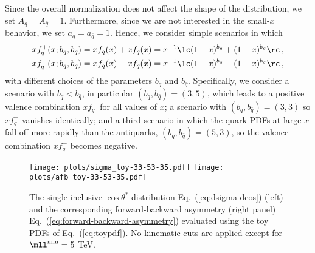 Since the overall normalization does not affect the shape
of the distribution, we set $A_q=A_{\bar{q}}=1$.
%
Furthermore, since we are not interested in the small-$x$ behavior,
we set $a_q=a_{\bar{q}}=1$. 
%
Hence, we consider simple scenarios in which 
\begin{align}\label{eq:toyp}
xf_q^+(x; b_q,b_{\bar{q}}) &= xf_q(x)+xf_{\bar{q}}(x) = x^{-1}\lc (1-x)^{b_q} +(1-x)^{b_{\bar{q}}}  \rc  \,, \\\label{eq:toym}
xf_q^-(x; b_q,b_{\bar{q}}) &= xf_q(x)-xf_{\bar{q}}(x) = x^{-1}\lc (1-x)^{b_q} -(1-x)^{b_{\bar{q}}}  \rc  \,, 
\end{align}
with different choices of the parameters  $b_q$ and $b_{\bar{q}}$.
Specifically, we consider a scenario with $b_q < b_{\bar{q}} $, in particular
$(b_q,b_{\bar{q}})=(3,5)$, which leads to a positive valence combination $xf_q^-$
for all values of $x$;  a  scenario with
$(b_q,b_{\bar{q}})=(3,3)$ so  $xf_q^-$ vanishes identically; and a third scenario
in which the quark PDFs at large-$x$ fall off more rapidly than the antiquarks,
$(b_q,b_{\bar{q}})=(5,3)$, so the valence combination $xf_q^-$ becomes negative.

\begin{figure}[!t]
 \centering
 \texttt{[image: plots/sigma\_toy-33-53-35.pdf]}
 \texttt{[image: plots/afb\_toy-33-53-35.pdf]}
 \caption{The single-inclusive $\cos\theta^*$ distribution
   Eq.~(\ref{eq:dsigma-dcos})  (left)
   and the corresponding forward-backward asymmetry
   (right panel) Eq.~(\ref{eq:forward-backward-asymmetry}) evaluated using 
    the toy PDFs of Eq.~(\ref{eq:toypdf}).
   No  kinematic cuts are applied except for $\mll^{\rm min}=5$ TeV.
 }    
 \label{fig:sigma_toy}
\end{figure}


